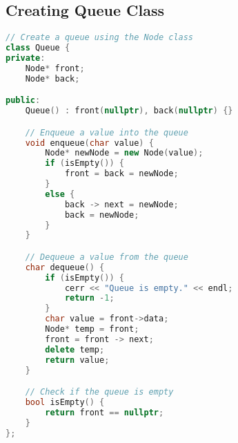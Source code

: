 \documentclass[letterpaper, 10pt,DIV=13]{scrartcl}
\numberwithin{equation}{section} %
\numberwithin{figure}{section} %
\numberwithin{table}{section} %
\begin{document}
\subsection{Creating Queue Class}
\begin{linenumbers}
\begin{lstlisting}[language=C++, caption={Queue Class}, label={code:example}]
// Create a queue using the Node class
class Queue {
private:
    Node* front;
    Node* back;

public:
    Queue() : front(nullptr), back(nullptr) {}

    // Enqueue a value into the queue
    void enqueue(char value) {
        Node* newNode = new Node(value);
        if (isEmpty()) {
            front = back = newNode;
        }
        else {
            back -> next = newNode;
            back = newNode;
        }
    }

    // Dequeue a value from the queue
    char dequeue() {
        if (isEmpty()) {
            cerr << "Queue is empty." << endl;
            return -1;
        }
        char value = front->data;
        Node* temp = front;
        front = front -> next;
        delete temp;
        return value;
    }

    // Check if the queue is empty
    bool isEmpty() {
        return front == nullptr;
    }
};
\end{lstlisting}
\end{linenumbers}
\nolinenumbers
\end{document}
